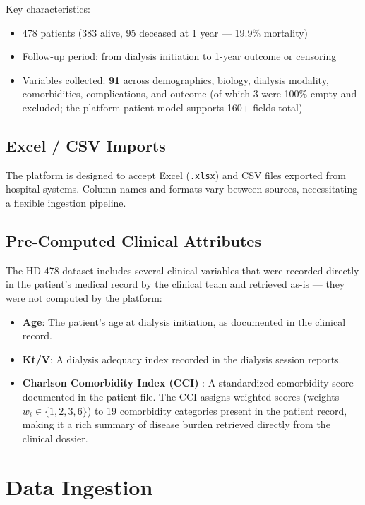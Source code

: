 \documentclass[12pt,a4paper,twoside]{report}
\begin{document}
Key characteristics:
\begin{itemize}
  \item 478 patients (383 alive, 95 deceased at 1 year — 19.9\% mortality)
  \item Follow-up period: from dialysis initiation to 1-year outcome or censoring
  \item Variables collected: \textbf{91} across demographics, biology, dialysis modality, comorbidities, complications, and outcome (of which 3 were 100\% empty and excluded; the platform patient model supports 160+ fields total)
\end{itemize}

\subsection{Excel / CSV Imports}

The platform is designed to accept Excel (\texttt{.xlsx}) and CSV files exported from hospital systems. Column names and formats vary between sources, necessitating a flexible ingestion pipeline.

\subsection{Pre-Computed Clinical Attributes}\label{sec:clinical_attrs}

The HD-478 dataset includes several clinical variables that were recorded directly in the patient's medical record by the clinical team and retrieved as-is — they were not computed by the platform:

\begin{itemize}
  \item \textbf{Age}: The patient's age at dialysis initiation, as documented in the clinical record.
  \item \textbf{Kt/V}: A dialysis adequacy index recorded in the dialysis session reports.
  \item \textbf{Charlson Comorbidity Index (CCI)} \cite{charlson1987}: A standardized comorbidity score documented in the patient file. The CCI assigns weighted scores (weights $w_i \in \{1,2,3,6\}$) to 19 comorbidity categories present in the patient record, making it a rich summary of disease burden retrieved directly from the clinical dossier.
\end{itemize}

\section{Data Ingestion}\label{sec:ingest}
\end{document}
